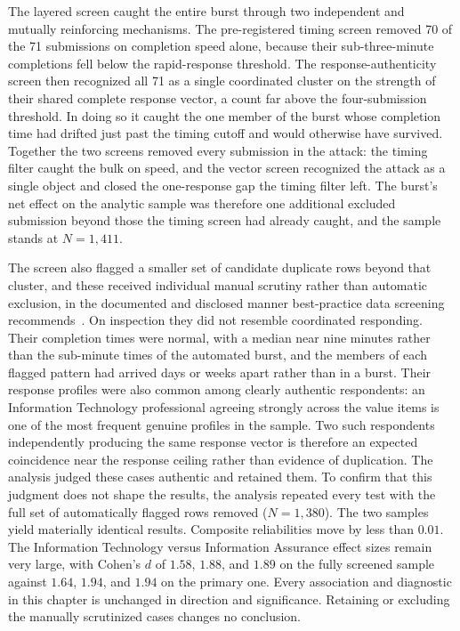 The layered screen caught the entire burst through two independent and mutually reinforcing mechanisms. The pre-registered timing screen removed 70 of the 71 submissions on completion speed alone, because their sub-three-minute completions fell below the rapid-response threshold. The response-authenticity screen then recognized all 71 as a single coordinated cluster on the strength of their shared complete response vector, a count far above the four-submission threshold. In doing so it caught the one member of the burst whose completion time had drifted just past the timing cutoff and would otherwise have survived. Together the two screens removed every submission in the attack: the timing filter caught the bulk on speed, and the vector screen recognized the attack as a single object and closed the one-response gap the timing filter left. The burst's net effect on the analytic sample was therefore one additional excluded submission beyond those the timing screen had already caught, and the sample stands at $N=1{,}411$.

The screen also flagged a smaller set of candidate duplicate rows beyond that cluster, and these received individual manual scrutiny rather than automatic exclusion, in the documented and disclosed manner best-practice data screening recommends~\parencite{DeSimone_Screening_2015}. On inspection they did not resemble coordinated responding. Their completion times were normal, with a median near nine minutes rather than the sub-minute times of the automated burst, and the members of each flagged pattern had arrived days or weeks apart rather than in a burst. Their response profiles were also common among clearly authentic respondents: an Information Technology professional agreeing strongly across the value items is one of the most frequent genuine profiles in the sample. Two such respondents independently producing the same response vector is therefore an expected coincidence near the response ceiling rather than evidence of duplication. The analysis judged these cases authentic and retained them. To confirm that this judgment does not shape the results, the analysis repeated every test with the full set of automatically flagged rows removed ($N=1{,}380$). The two samples yield materially identical results. Composite reliabilities move by less than $0.01$. The Information Technology versus Information Assurance effect sizes remain very large, with Cohen's $d$ of $1.58$, $1.88$, and $1.89$ on the fully screened sample against $1.64$, $1.94$, and $1.94$ on the primary one. Every association and diagnostic in this chapter is unchanged in direction and significance. Retaining or excluding the manually scrutinized cases changes no conclusion.

